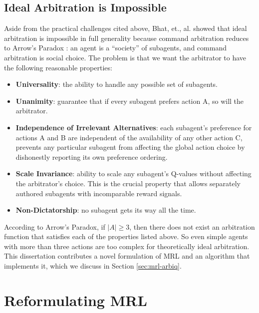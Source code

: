 \subsection{Ideal Arbitration is Impossible}

Aside from the practical challenges cited above, Bhat, et., al.  \cite{bhat2006on-the-difficulty} showed that ideal arbitration is impossible in full generality because command arbitration reduces to Arrow's Paradox \cite{arrow1963social}: an agent is a ``society'' of subagents, and command arbitration is social choice.  The problem is that we want the arbitrator to have the following reasonable properties:

\begin{itemize}

\item \textbf{Universality}: the ability to handle any possible set of
  subagents.

\item \textbf{Unanimity}: guarantee that if every subagent prefers
  action A, so will the arbitrator.

\item \textbf{Independence of Irrelevant Alternatives}: each
  subagent's preference for actions A and B are independent of the
  availability of any other action C, prevents any particular
  subagent from affecting the global action choice by dishonestly
  reporting its own preference ordering.

\item \textbf{Scale Invariance}: ability to scale any subagent's
  Q-values without affecting the arbitrator's choice.  This is the
  crucial property that allows separately authored subagents with
  incomparable reward signals.

\item \textbf{Non-Dictatorship}: no subagent gets its way all the time.

\end{itemize}

According to Arrow's Paradox, if $|A|\geq 3$, then there does not exist an arbitration function that satisfies each of the properties listed above.  So even simple agents with more than three actions are too complex for theoretically ideal arbitration.  This dissertation contributes a novel formulation of MRL and an algorithm that implements it, which we discuss in Section \ref{sec:mrl-arbiq}.

\section{Reformulating MRL}

